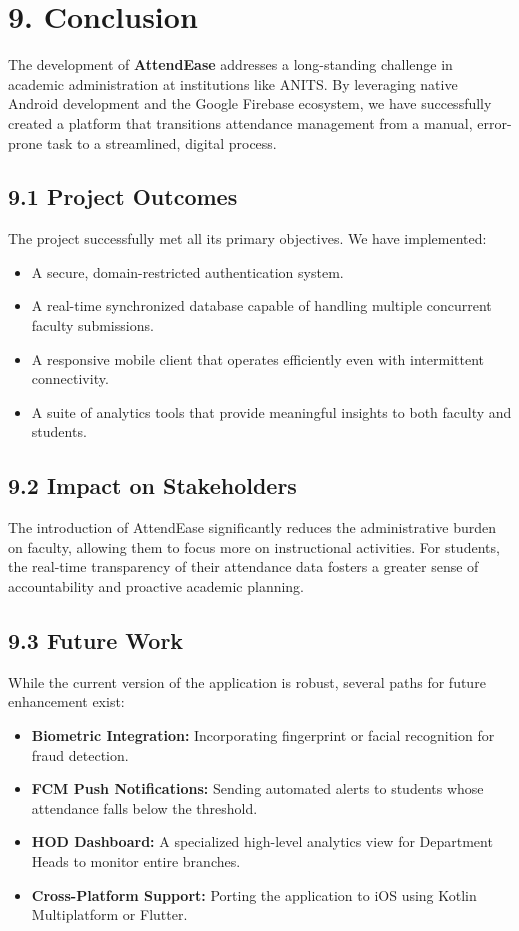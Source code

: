 \documentclass[12pt,a4paper]{report}
\begin{document}
\chapter*{9. Conclusion}

The development of \textbf{AttendEase} addresses a long-standing challenge in academic administration at institutions like ANITS. By leveraging native Android development and the Google Firebase ecosystem, we have successfully created a platform that transitions attendance management from a manual, error-prone task to a streamlined, digital process.

\section*{9.1 Project Outcomes}
The project successfully met all its primary objectives. We have implemented:
\begin{itemize}
    \item A secure, domain-restricted authentication system.
    \item A real-time synchronized database capable of handling multiple concurrent faculty submissions.
    \item A responsive mobile client that operates efficiently even with intermittent connectivity.
    \item A suite of analytics tools that provide meaningful insights to both faculty and students.
\end{itemize}

\section*{9.2 Impact on Stakeholders}
The introduction of AttendEase significantly reduces the administrative burden on faculty, allowing them to focus more on instructional activities. For students, the real-time transparency of their attendance data fosters a greater sense of accountability and proactive academic planning.

\section*{9.3 Future Work}
While the current version of the application is robust, several paths for future enhancement exist:
\begin{itemize}
    \item \textbf{Biometric Integration:} Incorporating fingerprint or facial recognition for fraud detection.
    \item \textbf{FCM Push Notifications:} Sending automated alerts to students whose attendance falls below the threshold.
    \item \textbf{HOD Dashboard:} A specialized high-level analytics view for Department Heads to monitor entire branches.
    \item \textbf{Cross-Platform Support:} Porting the application to iOS using Kotlin Multiplatform or Flutter.
\end{itemize}
\end{document}
